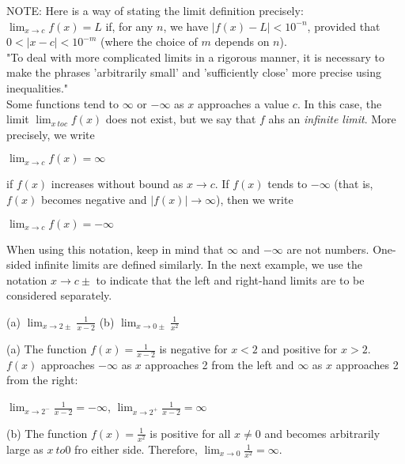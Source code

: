 \documentclass{article}
\begin{document}
NOTE: Here is a way of stating the limit definition precisely:\\
$\lim_{x \to c}f(x) = L$ if, for any $n$, we have $\left|f(x) -  L\right| < 10^{-n}$, provided that $0 < \left|x - c\right| < 10^{-m}$ (where the choice of $m$ depends on $n$).\\

"To deal with more complicated limits in a rigorous manner, it is necessary to make the phrases 'arbitrarily small' and 'sufficiently close' more precise using inequalities."\\

Some functions tend to $\infty$ or $-\infty$ as $x$ approaches a value $c$. In this case, the limit $\lim_{x \ to c}f(x)$ does not exist, but we say that $f$ ahs an \textit{infinite limit}. More precisely, we write
\begin{center}$\lim_{x \to c}f(x)=\infty$\end{center}
if $f(x)$ increases without bound as $x \to c$. If $f(x)$ tends to $-\infty$ (that is, $f(x)$ becomes negative and $\left|f(x)\right| \to \infty$), then we write
\begin{center}$\lim_{x \to c}f(x)=-\infty$\end{center}

When using this notation, keep in mind that $\infty$ and $-\infty$ are not numbers. One-sided infinite limits are defined similarly. In the next example, we use the notation $x \to c\pm$ to indicate that the left and right-hand limits are to be considered separately.

\begin{center}(a) $\lim_{x \to 2\pm}\frac{1}{x - 2}$ (b) $\lim_{x \to 0\pm}\frac{1}{x^2}$\end{center}

(a) The function $f(x) = \frac{1}{x - 2}$ is negative for $x < 2$ and positive for $x > 2$. $f(x)$ approaches $-\infty$ as $x$ approaches 2 from the left and $\infty$ as $x$ approaches 2 from the right:
\begin{center}$\lim_{x \to 2^-}\frac{1}{x - 2} = -\infty$, $\lim_{x \to 2^+}\frac{1}{x - 2} = \infty$\end{center}

(b) The function $f(x) = \frac{1}{x^2}$ is positive for all $x \neq 0$ and becomes arbitrarily large as $x\ to 0$ fro either side. Therefore, $\lim_{x \to 0}\frac{1}{x^2} = \infty$.\\
\end{document}
